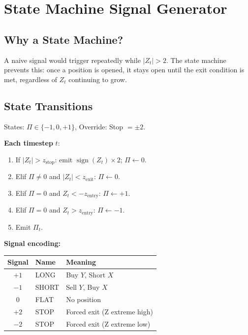 \documentclass[10pt,a4paper,twocolumn]{article}
\begin{document}
\section{State Machine Signal Generator}

\subsection{Why a State Machine?}

A naive signal would trigger repeatedly while $|Z_t|>2$.  The state
machine prevents this: once a position is opened, it stays open until the
exit condition is met, regardless of $Z_t$ continuing to grow.

\subsection{State Transitions}

\begin{tcolorbox}[mathbox={Formula 4 --- Signal State Machine}]
\vspace{-2pt}
States: $\Pi \in \{-1, 0, +1\}$, Override: Stop $= \pm 2$.

\smallskip
\noindent\textbf{Each timestep} $t$:
\begin{enumerate}\setlength\itemsep{0pt}
  \item If $|Z_t|>z_{\text{stop}}$: emit $\operatorname{sign}(Z_t)\times 2$;
        $\Pi\leftarrow 0$.
  \item Elif $\Pi\neq 0$ and $|Z_t|<z_{\text{exit}}$: $\Pi\leftarrow 0$.
  \item Elif $\Pi=0$ and $Z_t<-z_{\text{entry}}$: $\Pi\leftarrow +1$.
  \item Elif $\Pi=0$ and $Z_t>z_{\text{entry}}$: $\Pi\leftarrow -1$.
  \item Emit $\Pi_t$.
\end{enumerate}
\end{tcolorbox}

\noindent\textbf{Signal encoding:}
\begin{center}
{\small
\begin{tabular}{@{}cll@{}}
\toprule
Signal & Name & Meaning\\
\midrule
$+1$ & LONG & Buy $Y$, Short $X$\\
$-1$ & SHORT & Sell $Y$, Buy $X$\\
$0$  & FLAT & No position\\
$+2$ & STOP & Forced exit (Z extreme high)\\
$-2$ & STOP & Forced exit (Z extreme low)\\
\bottomrule
\end{tabular}
}
\end{center}
\end{document}
